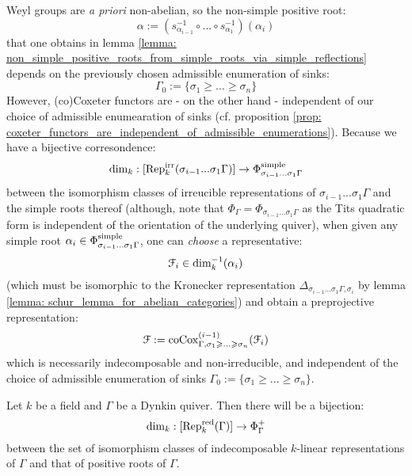             \begin{remark}
                Weyl groups are \textit{a priori} non-abelian, so the non-simple positive root:
                    $$\alpha := (s_{\alpha_{i - 1}}^{-1} \circ ... \circ s_{\alpha_1}^{-1})(\alpha_i)$$
                that one obtains in lemma \ref{lemma: non_simple_positive_roots_from_simple_roots_via_simple_reflections} depends on the previously chosen admissible enumeration of sinks:
                    $$\Gamma_0 := \{\sigma_1 \geq ... \geq \sigma_n\}$$
                However, (co)Coxeter functors are - on the other hand - independent of our choice of admissible enumearation of sinks (cf. proposition \ref{prop: coxeter_functors_are_independent_of_admissible_enumerations}). Because we have a bijective corresondence:
                    $$\dim_k: [\mathrm{Rep}_k^{\mathrm{irr}}(\sigma_{i - 1} ... \sigma_1\Gamma)] \to \Phi_{\sigma_{i - 1} ... \sigma_1\Gamma}^{\mathrm{simple}}$$
                between the isomorphism classes of irreucible representations of $\sigma_{i - 1} ... \sigma_1\Gamma$ and the simple roots thereof (although, note that $\Phi_{\Gamma} = \Phi_{\sigma_{i - 1} ... \sigma_1 \Gamma}$ as the Tits quadratic form is independent of the orientation of the underlying quiver), when given any simple root $\alpha_i \in \Phi_{\sigma_{i - 1} ... \sigma_1\Gamma}^{\mathrm{simple}}$, one can \textit{choose} a representative:
                    $$\mathcal{F}_i \in \dim_k^{-1}(\alpha_i)$$
                (which must be isomorphic to the Kronecker representation $\Delta_{\sigma_{i - 1} ... \sigma_1\Gamma, \sigma_i}$ by lemma \ref{lemma: schur_lemma_for_abelian_categories}) and obtain a preprojective representation:
                    $$\mathcal{F} := \mathrm{co}\mathrm{Cox}^{(i - 1)}_{\Gamma, \sigma_1 \geqslant ... \geqslant \sigma_n}(\mathcal{F}_i)$$
                which is necessarily indecomposable and non-irreducible, and independent of the choice of admissible enumeration of sinks $\Gamma_0 := \{\sigma_1 \geq ... \geq \sigma_n\}$.
            \end{remark}
            \begin{theorem} \label{theorem: indecomposable_representations_of_dynkin_quivers_are_labelled_by_positive_roots}
                Let $k$ be a field and $\Gamma$ be a Dynkin quiver. Then there will be a bijection:
                    $$\dim_k: [\mathrm{Rep}_k^{\mathrm{red}}(\Gamma)] \to \Phi_{\Gamma}^+$$
                between the set of isomorphism classes of indecomposable $k$-linear representations of $\Gamma$ and that of positive roots of $\Gamma$.
            \end{theorem}
